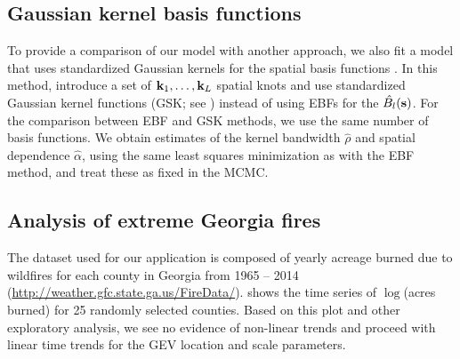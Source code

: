 \subsection{Gaussian kernel basis functions}

To provide a comparison of our model with another approach, we also fit a model that uses standardized Gaussian kernels for the spatial basis functions \citep{Reich2012}.
In this method, \citeauthor{Reich2012} introduce a set of $\mathbf{k}_1, \ldots, \mathbf{k}_L$ spatial knots and use standardized Gaussian kernel functions (GSK; see ) instead of using EBFs for the $\hat{B_l}(\mathbf{s})$.
For the comparison between EBF and GSK methods, we use the same number of basis functions.
We obtain estimates of the kernel bandwidth $\hat{\rho}$ and spatial dependence $\hat{\alpha}$, using the same least squares minimization as with the EBF method, and treat these as fixed in the MCMC.

\subsection{Analysis of extreme Georgia fires}\label{ebs:georgia}

The dataset used for our application is composed of yearly acreage burned due to wildfires for each county in Georgia from 1965 -- 2014 (\url{http://weather.gfc.state.ga.us/FireData/}).
 shows the time series of $\log$(acres burned) for 25 randomly selected counties.
Based on this plot and other exploratory analysis, we see no evidence of non-linear trends and proceed with linear time trends for the GEV location and scale parameters.

